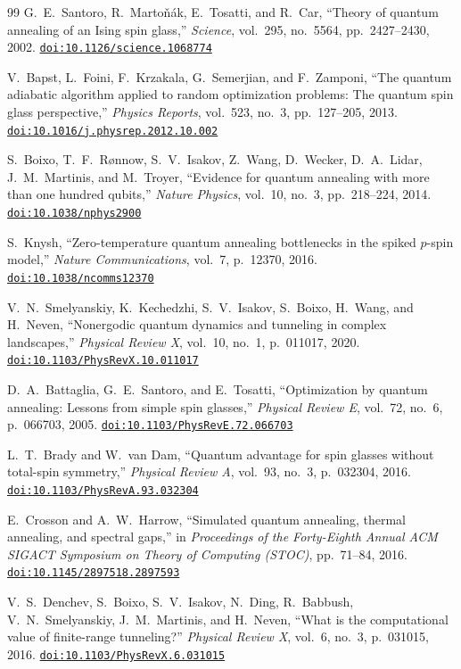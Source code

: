 \documentclass[12pt,a4paper]{report}
\providecommand{\doi}[1]{\href{https://doi.org/#1}{\nolinkurl{doi:#1}}}
\begin{document}
\begin{thebibliography}{99}
G.~E.~Santoro, R.~Marto{\v{n}}{\'a}k, E.~Tosatti, and R.~Car,
``Theory of quantum annealing of an Ising spin glass,''
\emph{Science}, vol.~295, no.~5564, pp.~2427--2430, 2002.
\doi{10.1126/science.1068774}

V.~Bapst, L.~Foini, F.~Krzakala, G.~Semerjian, and F.~Zamponi,
``The quantum adiabatic algorithm applied to random optimization problems: The quantum spin glass perspective,''
\emph{Physics Reports}, vol.~523, no.~3, pp.~127--205, 2013.
\doi{10.1016/j.physrep.2012.10.002}

S.~Boixo, T.~F.~R{\o}nnow, S.~V.~Isakov, Z.~Wang, D.~Wecker, D.~A.~Lidar, J.~M.~Martinis, and M.~Troyer,
``Evidence for quantum annealing with more than one hundred qubits,''
\emph{Nature Physics}, vol.~10, no.~3, pp.~218--224, 2014.
\doi{10.1038/nphys2900}

S.~Knysh,
``Zero-temperature quantum annealing bottlenecks in the spiked $p$-spin model,''
\emph{Nature Communications}, vol.~7, p.~12370, 2016.
\doi{10.1038/ncomms12370}

V.~N.~Smelyanskiy, K.~Kechedzhi, S.~V.~Isakov, S.~Boixo, H.~Wang, and H.~Neven,
``Nonergodic quantum dynamics and tunneling in complex landscapes,''
\emph{Physical Review X}, vol.~10, no.~1, p.~011017, 2020.
\doi{10.1103/PhysRevX.10.011017}

D.~A.~Battaglia, G.~E.~Santoro, and E.~Tosatti,
``Optimization by quantum annealing: Lessons from simple spin glasses,''
\emph{Physical Review E}, vol.~72, no.~6, p.~066703, 2005.
\doi{10.1103/PhysRevE.72.066703}

L.~T.~Brady and W.~van Dam,
``Quantum advantage for spin glasses without total-spin symmetry,''
\emph{Physical Review A}, vol.~93, no.~3, p.~032304, 2016.
\doi{10.1103/PhysRevA.93.032304}

E.~Crosson and A.~W.~Harrow,
``Simulated quantum annealing, thermal annealing, and spectral gaps,''
in \emph{Proceedings of the Forty-Eighth Annual ACM SIGACT Symposium on Theory of Computing (STOC)}, pp.~71--84, 2016.
\doi{10.1145/2897518.2897593}

V.~S.~Denchev, S.~Boixo, S.~V.~Isakov, N.~Ding, R.~Babbush, V.~N.~Smelyanskiy, J.~M.~Martinis, and H.~Neven,
``What is the computational value of finite-range tunneling?''
\emph{Physical Review X}, vol.~6, no.~3, p.~031015, 2016.
\doi{10.1103/PhysRevX.6.031015}


\end{thebibliography}
\end{document}
